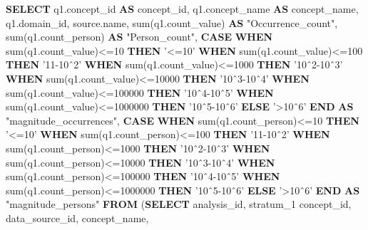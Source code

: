 \documentclass[]{book}
\newenvironment{Shaded}{\begin{snugshade}}{\end{snugshade}}
\newcommand{\KeywordTok}[1]{\textcolor[rgb]{0.13,0.29,0.53}{\textbf{#1}}}
\newcommand{\DecValTok}[1]{\textcolor[rgb]{0.00,0.00,0.81}{#1}}
\newcommand{\StringTok}[1]{\textcolor[rgb]{0.31,0.60,0.02}{#1}}
\newcommand{\OtherTok}[1]{\textcolor[rgb]{0.56,0.35,0.01}{#1}}
\newcommand{\FunctionTok}[1]{\textcolor[rgb]{0.00,0.00,0.00}{#1}}
\newcommand{\NormalTok}[1]{#1}
\begin{document}
\begin{Shaded}
\begin{Highlighting}[]
\KeywordTok{SELECT}
\NormalTok{    q1.concept_id }\KeywordTok{AS}\NormalTok{ concept_id,}
\NormalTok{    q1.concept_name }\KeywordTok{AS}\NormalTok{ concept_name,}
\NormalTok{    q1.domain_id,}
\NormalTok{    source.name,}
    \FunctionTok{sum}\NormalTok{(q1.count_value) }\KeywordTok{AS} \OtherTok{"Occurrence_count"}\NormalTok{,}
    \FunctionTok{sum}\NormalTok{(q1.count_person) }\KeywordTok{AS} \OtherTok{"Person_count"}\NormalTok{,}
    \KeywordTok{CASE} 
        \KeywordTok{WHEN} \FunctionTok{sum}\NormalTok{(q1.count_value)<=}\DecValTok{10} \KeywordTok{THEN} \StringTok{'<=10'}
        \KeywordTok{WHEN} \FunctionTok{sum}\NormalTok{(q1.count_value)<=}\DecValTok{100} \KeywordTok{THEN} \StringTok{'11-10ˆ2'}
        \KeywordTok{WHEN} \FunctionTok{sum}\NormalTok{(q1.count_value)<=}\DecValTok{1000} \KeywordTok{THEN} \StringTok{'10ˆ2-10ˆ3'}
        \KeywordTok{WHEN} \FunctionTok{sum}\NormalTok{(q1.count_value)<=}\DecValTok{10000} \KeywordTok{THEN} \StringTok{'10ˆ3-10ˆ4'}
        \KeywordTok{WHEN} \FunctionTok{sum}\NormalTok{(q1.count_value)<=}\DecValTok{100000} \KeywordTok{THEN} \StringTok{'10ˆ4-10ˆ5'}
        \KeywordTok{WHEN} \FunctionTok{sum}\NormalTok{(q1.count_value)<=}\DecValTok{1000000} \KeywordTok{THEN} \StringTok{'10ˆ5-10ˆ6'}
        \KeywordTok{ELSE} \StringTok{'>10ˆ6'}
    \KeywordTok{END} \KeywordTok{AS} \OtherTok{"magnitude_occurrences"}\NormalTok{,}
    \KeywordTok{CASE} 
        \KeywordTok{WHEN} \FunctionTok{sum}\NormalTok{(q1.count_person)<=}\DecValTok{10} \KeywordTok{THEN} \StringTok{'<=10'}
        \KeywordTok{WHEN} \FunctionTok{sum}\NormalTok{(q1.count_person)<=}\DecValTok{100} \KeywordTok{THEN} \StringTok{'11-10ˆ2'}
        \KeywordTok{WHEN} \FunctionTok{sum}\NormalTok{(q1.count_person)<=}\DecValTok{1000} \KeywordTok{THEN} \StringTok{'10ˆ2-10ˆ3'}
        \KeywordTok{WHEN} \FunctionTok{sum}\NormalTok{(q1.count_person)<=}\DecValTok{10000} \KeywordTok{THEN} \StringTok{'10ˆ3-10ˆ4'}
        \KeywordTok{WHEN} \FunctionTok{sum}\NormalTok{(q1.count_person)<=}\DecValTok{100000} \KeywordTok{THEN} \StringTok{'10ˆ4-10ˆ5'}
        \KeywordTok{WHEN} \FunctionTok{sum}\NormalTok{(q1.count_person)<=}\DecValTok{1000000} \KeywordTok{THEN} \StringTok{'10ˆ5-10ˆ6'}
        \KeywordTok{ELSE} \StringTok{'>10ˆ6'}
    \KeywordTok{END} \KeywordTok{AS} \OtherTok{"magnitude_persons"}
\KeywordTok{FROM}\NormalTok{ (}\KeywordTok{SELECT}\NormalTok{ analysis_id,}
\NormalTok{             stratum_1 concept_id,}
\NormalTok{             data_source_id,}
\NormalTok{             concept_name,}

\end{Highlighting}
\end{Shaded}
\end{document}
